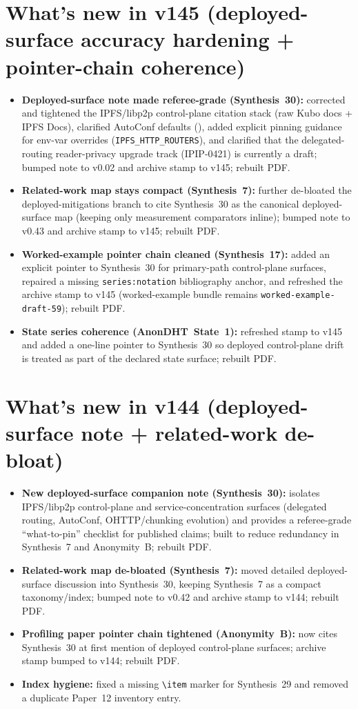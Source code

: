 \documentclass[11pt]{article}
\begin{document}
\section{What's new in v145 (deployed-surface accuracy hardening + pointer-chain coherence)}
\begin{itemize}[leftmargin=*]
\item \textbf{Deployed-surface note made referee-grade (Synthesis~30):} corrected and tightened the IPFS/libp2p control-plane citation stack (raw Kubo docs + IPFS Docs), clarified AutoConf defaults (), added explicit pinning guidance for env-var overrides (\texttt{IPFS\_HTTP\_ROUTERS}), and clarified that the delegated-routing reader-privacy upgrade track (IPIP-0421) is currently a draft; bumped note to v0.02 and archive stamp to v145; rebuilt PDF.
\item \textbf{Related-work map stays compact (Synthesis~7):} further de-bloated the deployed-mitigations branch to cite Synthesis~30 as the canonical deployed-surface map (keeping only measurement comparators inline); bumped note to v0.43 and archive stamp to v145; rebuilt PDF.
\item \textbf{Worked-example pointer chain cleaned (Synthesis~17):} added an explicit pointer to Synthesis~30 for primary-path control-plane surfaces, repaired a missing \texttt{series:notation} bibliography anchor, and refreshed the archive stamp to v145 (worked-example bundle remains \texttt{worked-example-draft-59}); rebuilt PDF.
\item \textbf{State series coherence (AnonDHT~State~1):} refreshed stamp to v145 and added a one-line pointer to Synthesis~30 so deployed control-plane drift is treated as part of the declared state surface; rebuilt PDF.
\end{itemize}

\section{What's new in v144 (deployed-surface note + related-work de-bloat)}
\begin{itemize}[leftmargin=*]
\item \textbf{New deployed-surface companion note (Synthesis~30):} isolates IPFS/libp2p control-plane and service-concentration surfaces (delegated routing, AutoConf, OHTTP/chunking evolution) and provides a referee-grade ``what-to-pin'' checklist for published claims; built to reduce redundancy in Synthesis~7 and Anonymity~B; rebuilt PDF.
\item \textbf{Related-work map de-bloated (Synthesis~7):} moved detailed deployed-surface discussion into Synthesis~30, keeping Synthesis~7 as a compact taxonomy/index; bumped note to v0.42 and archive stamp to v144; rebuilt PDF.
\item \textbf{Profiling paper pointer chain tightened (Anonymity~B):} now cites Synthesis~30 at first mention of deployed control-plane surfaces; archive stamp bumped to v144; rebuilt PDF.
\item \textbf{Index hygiene:} fixed a missing \texttt{\textbackslash item} marker for Synthesis~29 and removed a duplicate Paper~12 inventory entry.
\end{itemize}
\end{document}
